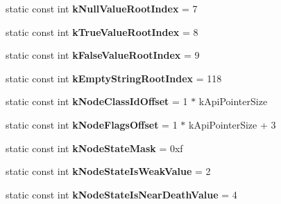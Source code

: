\begin{DoxyCompactItemize}
\item 
\hypertarget{classv8_1_1internal_1_1_internals_ab311cf753ec5c968052bd83ef21e83f8}{}static const int {\bfseries k\+Null\+Value\+Root\+Index} = 7\label{classv8_1_1internal_1_1_internals_ab311cf753ec5c968052bd83ef21e83f8}

\item 
\hypertarget{classv8_1_1internal_1_1_internals_a93abd58b178eca469bade28e68b5c59e}{}static const int {\bfseries k\+True\+Value\+Root\+Index} = 8\label{classv8_1_1internal_1_1_internals_a93abd58b178eca469bade28e68b5c59e}

\item 
\hypertarget{classv8_1_1internal_1_1_internals_a90b6837aa368bbe4ffd914e6f753b167}{}static const int {\bfseries k\+False\+Value\+Root\+Index} = 9\label{classv8_1_1internal_1_1_internals_a90b6837aa368bbe4ffd914e6f753b167}

\item 
\hypertarget{classv8_1_1internal_1_1_internals_a6f669f3d98fe653b281b26be3bc0655a}{}static const int {\bfseries k\+Empty\+String\+Root\+Index} = 118\label{classv8_1_1internal_1_1_internals_a6f669f3d98fe653b281b26be3bc0655a}

\item 
\hypertarget{classv8_1_1internal_1_1_internals_af4fb6d499cb87f03031ad4d6be6bcd8f}{}static const int {\bfseries k\+Node\+Class\+Id\+Offset} = 1 $\ast$ k\+Api\+Pointer\+Size\label{classv8_1_1internal_1_1_internals_af4fb6d499cb87f03031ad4d6be6bcd8f}

\item 
\hypertarget{classv8_1_1internal_1_1_internals_aee5606f2a44d43d8dafe344e0bb753ef}{}static const int {\bfseries k\+Node\+Flags\+Offset} = 1 $\ast$ k\+Api\+Pointer\+Size + 3\label{classv8_1_1internal_1_1_internals_aee5606f2a44d43d8dafe344e0bb753ef}

\item 
\hypertarget{classv8_1_1internal_1_1_internals_a853acc088978d38a5a69091cf857a46d}{}static const int {\bfseries k\+Node\+State\+Mask} = 0xf\label{classv8_1_1internal_1_1_internals_a853acc088978d38a5a69091cf857a46d}

\item 
\hypertarget{classv8_1_1internal_1_1_internals_a8a5d4cc92a6952c2a50922c77a606e68}{}static const int {\bfseries k\+Node\+State\+Is\+Weak\+Value} = 2\label{classv8_1_1internal_1_1_internals_a8a5d4cc92a6952c2a50922c77a606e68}

\item 
\hypertarget{classv8_1_1internal_1_1_internals_a18f3e757639b07bdabb8cda7dd4a8bdb}{}static const int {\bfseries k\+Node\+State\+Is\+Near\+Death\+Value} = 4\label{classv8_1_1internal_1_1_internals_a18f3e757639b07bdabb8cda7dd4a8bdb}


\end{DoxyCompactItemize}

